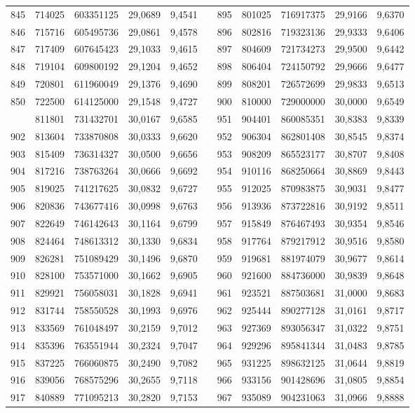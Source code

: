 \begin{longtable}{rrrrrrrrrrr}
845&714025&603351125&29,0689&9,4541&&895&801025&716917375&29,9166&9,6370\\
846&715716&605495736&29,0861&9,4578&&896&802816&719323136&29,9333&9,6406\\
847&717409&607645423&29,1033&9,4615&&897&804609&721734273&29,9500&9,6442\\
848&719104&609800192&29,1204&9,4652&&898&806404&724150792&29,9666&9,6477\\
849&720801&611960049&29,1376&9,4690&&899&808201&726572699&29,9833&9,6513\\
850&722500&614125000&29,1548&9,4727&&900&810000&729000000&30,0000&9,6549\\
\newpage
901&811801&731432701&30,0167&9,6585&&951&904401&860085351&30,8383&9,8339\\
902&813604&733870808&30,0333&9,6620&&952&906304&862801408&30,8545&9,8374\\
903&815409&736314327&30,0500&9,6656&&953&908209&865523177&30,8707&9,8408\\
904&817216&738763264&30,0666&9,6692&&954&910116&868250664&30,8869&9,8443\\
905&819025&741217625&30,0832&9,6727&&955&912025&870983875&30,9031&9,8477\\
906&820836&743677416&30,0998&9,6763&&956&913936&873722816&30,9192&9,8511\\
907&822649&746142643&30,1164&9,6799&&957&915849&876467493&30,9354&9,8546\\
908&824464&748613312&30,1330&9,6834&&958&917764&879217912&30,9516&9,8580\\
909&826281&751089429&30,1496&9,6870&&959&919681&881974079&30,9677&9,8614\\
910&828100&753571000&30,1662&9,6905&&960&921600&884736000&30,9839&9,8648\\
911&829921&756058031&30,1828&9,6941&&961&923521&887503681&31,0000&9,8683\\
912&831744&758550528&30,1993&9,6976&&962&925444&890277128&31,0161&9,8717\\
913&833569&761048497&30,2159&9,7012&&963&927369&893056347&31,0322&9,8751\\
914&835396&763551944&30,2324&9,7047&&964&929296&895841344&31,0483&9,8785\\
915&837225&766060875&30,2490&9,7082&&965&931225&898632125&31,0644&9,8819\\
916&839056&768575296&30,2655&9,7118&&966&933156&901428696&31,0805&9,8854\\
917&840889&771095213&30,2820&9,7153&&967&935089&904231063&31,0966&9,8888\\

\end{longtable}
